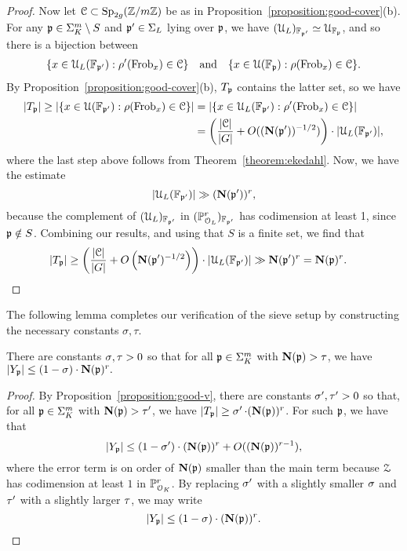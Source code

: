 \begin{proof}
	Now let $\mathcal C \subset \operatorname{Sp}_{2g}({\mathbb Z} / m {\mathbb Z})$ be as in Proposition~\ref{proposition:good-cover}(b). For any $\mathfrak{p} \in \Sigma^m_K \setminus S$
	and $\mathfrak p' \in \Sigma_{L}$ lying over $\mathfrak p$, we have
$(\mathcal{U}_{L})_{\mathbb F_{\mathfrak p'}} \simeq \mathcal{U}_{\mathbb F_\mathfrak p}$, and so there
is a bijection between
	\begin{align*}
		\{x \in \mathcal{U}_{L}({\mathbb F_{\mathfrak p'}}) : \rho'(\operatorname{Frob}_x) \in \mathcal C\}
		\quad \text{and} \quad \{x \in \mathcal{U}({\mathbb F_{\mathfrak p}}) : \rho(\operatorname{Frob}_x) \in \mathcal C\}.
	\end{align*}
	By Proposition~\ref{proposition:good-cover}(b), $T_{\mathfrak{p}}$ contains the latter set, so we have
	\begin{align*}
		|T_{\mathfrak{p}}| \ge |\{x \in \mathcal{U}({\mathbb F_{\mathfrak p'}}) : \rho(\operatorname{Frob}_x) \in \mathcal C\}| &= |\{x \in \mathcal{U}_{L}({\mathbb F_{\mathfrak p'}}) : \rho'(\operatorname{Frob}_x) \in \mathcal C\}| \\
		&= \left( \frac{|\mathcal C|}{|G|} + O((\mathbf{N}(\mathfrak{p}'))^{-1/2}) \right) \cdot |\mathcal{U}_{L}({\mathbb F_{\mathfrak p'}})|,
	\end{align*}
	where the last step above follows from Theorem~\ref{theorem:ekedahl}. Now, we have the estimate
    \[
		|\mathcal{U}_{L}({\mathbb F_{\mathfrak{p}'}})| \gg (\mathbf{N}(\mathfrak{p}'))^r,
	\]
	because the complement of $(\mathcal{U}_{L})_{\mathbb F_{\mathfrak p'}}$ in $({\mathbb P}^r_{\mathcal{O}_{L}})_{\mathbb F_{\mathfrak p'}}$ has codimension at least 1, since $\mathfrak p \notin S$. Combining our results, and using that $S$ is a finite set, we find that
	\begin{align*}
		|T_\mathfrak p| \geq \left( \frac{|\mathcal C|}{|G|} + O\left(\mathbf{N}(\mathfrak{p}')^{-1/2}\right) \right) \cdot |\mathcal{U}_{L}({\mathbb F_{\mathfrak p'}})| &\gg \mathbf{N}(\mathfrak{p}')^r = \mathbf{N}(\mathfrak{p})^r. \qedhere
	\end{align*}
\end{proof}

The following lemma completes our verification of the sieve setup by constructing the necessary constants $\sigma, \tau$.

\begin{lemma}
	\label{lemma:bounding-Y-reduction}
	There are constants $\operatorname{\sigma},\operatorname{\tau} > 0$ so that for all $\mathfrak p \in \Sigma^m_K$ with $\mathbf{N}(\mathfrak p) > \tau$, we have
	$|Y_\mathfrak p| \leq \left( 1-\operatorname{\sigma} \right) \cdot \mathbf{N} (\mathfrak p)^r.$
\end{lemma}
\begin{proof}
By Proposition~\ref{proposition:good-v}, there are constants $\operatorname{\sigma}', \operatorname{\tau}' > 0$ so that, for all $\mathfrak p \in \Sigma^m_K$ with $\mathbf{N}(\mathfrak p) > \operatorname{\tau}'$,
we have $|T_{\mathfrak{p}}| \geq \operatorname{\sigma}' \cdot(\mathbf{N}(\mathfrak p))^r$.
For such $\mathfrak{p}$, we have that
\[
	|Y_{\mathfrak{p}}| \le (1 - \operatorname{\sigma}') \cdot (\mathbf{N}(\mathfrak{p}))^r + O((\mathbf{N}(\mathfrak{p}))^{r-1}),
\]
where the error term is on order of $\mathbf{N}(\mathfrak p)$ smaller than the main term because $\mathcal{Z}$ has codimension at least $1$ in ${\mathbb P}^r_{\mathcal{O}_K}$. By replacing $\operatorname{\sigma}'$ with a slightly smaller $\operatorname{\sigma}$ and $\operatorname{\tau}'$ with a slightly larger $\operatorname{\tau}$, we may write
\[
	|Y_{\mf{p}}| \le (1 - \galSlope) \cdot (\N(\mf{p}))^r. \hfill \qedhere
\]
\end{proof}

